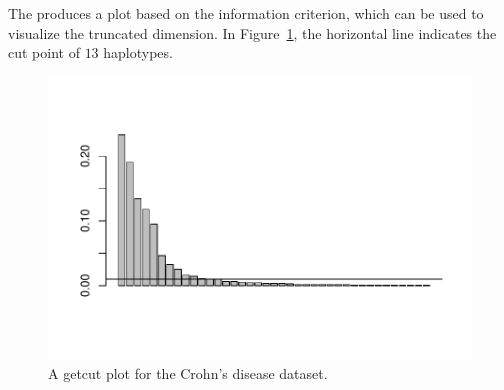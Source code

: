 The  produces a plot based on the information
criterion, which can be used to visualize the truncated dimension.
In Figure~\ref{fig:getcut}, the horizontal line indicates the cut point
of $13$ haplotypes.
\begin{figure}[h]
\begin{center}
\includegraphics[width=6.0in]{./phyclust-include/f-getcut}
\caption{A getcut plot for the Crohn's disease dataset.}
\label{fig:getcut}
\end{center}
\end{figure}
